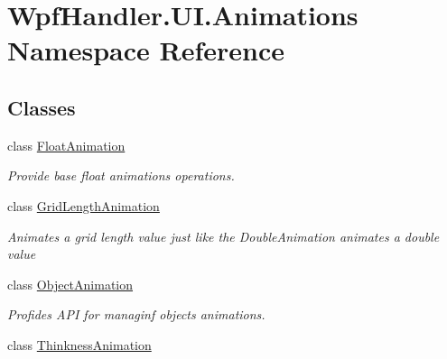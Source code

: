 \hypertarget{namespace_wpf_handler_1_1_u_i_1_1_animations}{}\section{Wpf\+Handler.\+U\+I.\+Animations Namespace Reference}
\label{namespace_wpf_handler_1_1_u_i_1_1_animations}
\subsection*{Classes}
\begin{DoxyCompactItemize}
\item 
class \mbox{\hyperlink{class_wpf_handler_1_1_u_i_1_1_animations_1_1_float_animation}{Float\+Animation}}
\begin{DoxyCompactList}\small\item\em Provide base float animations operations. \end{DoxyCompactList}\item 
class \mbox{\hyperlink{class_wpf_handler_1_1_u_i_1_1_animations_1_1_grid_length_animation}{Grid\+Length\+Animation}}
\begin{DoxyCompactList}\small\item\em Animates a grid length value just like the Double\+Animation animates a double value \end{DoxyCompactList}\item 
class \mbox{\hyperlink{class_wpf_handler_1_1_u_i_1_1_animations_1_1_object_animation}{Object\+Animation}}
\begin{DoxyCompactList}\small\item\em Profides A\+PI for managinf objects animations. \end{DoxyCompactList}\item 
class \mbox{\hyperlink{class_wpf_handler_1_1_u_i_1_1_animations_1_1_thinkness_animation}{Thinkness\+Animation}}
\end{DoxyCompactItemize}
